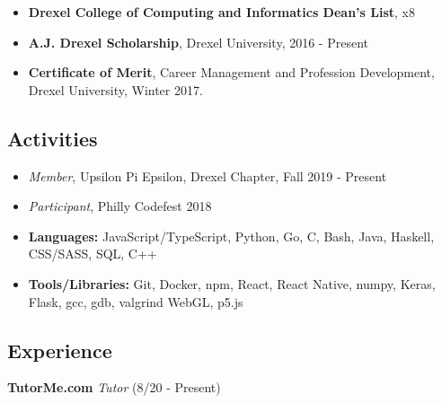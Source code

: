 \documentclass[10pt]{article}
\begin{document}
\begin{multicols}{2}
    \vspace{-\topsep}
    \begin{itemize}[leftmargin=*,noitemsep,topsep=0pt]
        \item \textbf{Drexel College of Computing and
            Informatics Dean's List}, x8
        \item \textbf{A.J. Drexel Scholarship}, Drexel University,
            2016 - Present
        \item \textbf{Certificate of Merit}, Career Management and
            Profession Development, Drexel University, Winter 2017.
    \end{itemize}

    \vspace{-\topsep}
    \subsection*{Activities}%
    \label{sub:Activities}

    \vspace{-\topsep}
    \begin{itemize}[leftmargin=*,noitemsep,topsep=0pt]
        \item \emph{Member}, Upsilon Pi Epsilon, Drexel Chapter,
            Fall 2019 - Present
        \item \emph{Participant}, Philly Codefest 2018
    \end{itemize}

    \vfill\null
\end{multicols}

\vspace{-2.5em}
\begin{itemize}[leftmargin=*,noitemsep,topsep=0pt]
    \item \textbf{Languages:} JavaScript/TypeScript, Python, Go, C,
        Bash, Java, Haskell, CSS/SASS, SQL, C++
    \item \textbf{Tools/Libraries:} Git, Docker, npm, React,
        React Native, numpy, Keras, Flask, gcc, gdb, valgrind WebGL, p5.js
\end{itemize}

\vspace{-1.5em}
\subsection*{Experience}%
\label{sub:Experience}

\vspace{-0.5em}
\textbf{TutorMe.com}
\emph{Tutor}
(8/20 - Present)
\end{document}
